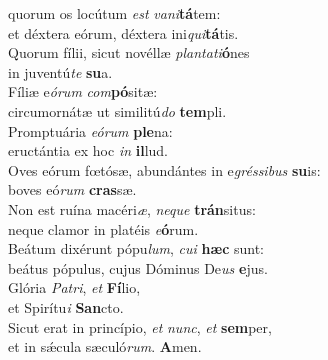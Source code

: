 \evenverse  quorum os locútum \textit{est} \textit{va}\textit{ni}\textbf{tá}tem:~\*\\
\evenverse et déxtera eórum, déxtera ini\textit{qui}\textbf{tá}tis.\\
\oddverse Quorum fílii, sicut novéllæ \textit{plan}\textit{ta}\textit{ti}\textbf{ó}nes~\*\\
\oddverse in juventú\textit{te} \textbf{su}a.\\
\evenverse Fíliæ e\textit{ó}\textit{rum} \textit{com}\textbf{pó}sitæ:~\*\\
\evenverse circumornátæ ut similitú\textit{do} \textbf{tem}pli.\\
\oddverse Promptuária \textit{e}\textit{ó}\textit{rum} \textbf{ple}na:~\*\\
\oddverse eructántia ex hoc \textit{in} \textbf{il}lud.\\
\evenverse Oves eórum fœtósæ, abundántes in e\textit{grés}\textit{si}\textit{bus} \textbf{su}is:~\*\\
\evenverse boves eó\textit{rum} \textbf{cras}sæ.\\
\oddverse Non est ruína macéri\textit{æ}, \textit{ne}\textit{que} \textbf{trán}situs:~\*\\
\oddverse neque clamor in platéis \textit{e}\textbf{ó}rum.\\
\evenverse Beátum dixérunt pópu\textit{lum}, \textit{cu}\textit{i} \textbf{hæc} sunt:~\*\\
\evenverse beátus pópulus, cujus Dóminus De\textit{us} \textbf{e}jus.\\
\oddverse Glória \textit{Pa}\textit{tri}, \textit{et} \textbf{Fí}lio,~\*\\
\oddverse et Spirítu\textit{i} \textbf{San}cto.\\
\evenverse Sicut erat in princípio, \textit{et} \textit{nunc}, \textit{et} \textbf{sem}per,~\*\\
\evenverse et in sǽcula sæculó\textit{rum}. \textbf{A}men.\\
